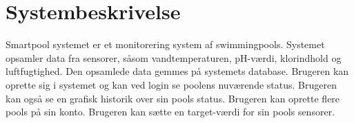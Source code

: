 \section{Systembeskrivelse}
Smartpool systemet er et monitorering system af swimmingpools. Systemet opsamler data fra sensorer, såsom vandtemperaturen, pH-værdi, klorindhold og luftfugtighed. Den opsamlede data gemmes på systemets database. Brugeren kan oprette sig i systemet og kan ved login se poolens nuværende status. Brugeren kan også se en grafisk historik over sin pools status. Brugeren kan oprette flere pools på sin konto. Brugeren kan sætte en target-værdi for sin pools sensorer.  